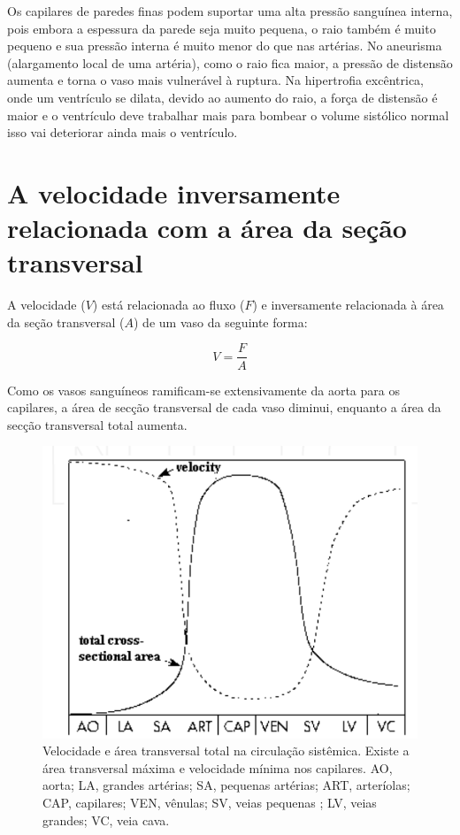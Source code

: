 \documentclass[
  portuguese,
  ]{book}
\begin{document}
Os capilares de paredes finas podem suportar uma alta pressão sanguínea interna, pois embora a espessura da parede seja muito pequena, o raio também é muito pequeno e sua pressão interna é muito menor do que nas artérias. No aneurisma (alargamento local de uma artéria), como o raio fica maior, a pressão de distensão aumenta e torna o vaso mais vulnerável à ruptura. Na hipertrofia excêntrica, onde um ventrículo se dilata, devido ao aumento do raio, a força de distensão é maior e o ventrículo deve trabalhar mais para bombear o volume sistólico normal isso vai deteriorar ainda mais o ventrículo.

\hypertarget{a-velocidade-inversamente-relacionada-com-a-uxe1rea-da-seuxe7uxe3o-transversal}{%
\section{A velocidade inversamente relacionada com a área da seção transversal}\label{a-velocidade-inversamente-relacionada-com-a-uxe1rea-da-seuxe7uxe3o-transversal}}

A velocidade (\(V\)) está relacionada ao fluxo (\(F\)) e inversamente relacionada à área da seção transversal (\(A\)) de um vaso da seguinte forma:

\begin{equation}
V=\frac{F}{A}
\label{eq:velo}
\end{equation}

Como os vasos sanguíneos ramificam-se extensivamente da aorta para os capilares, a área de secção transversal de cada vaso diminui, enquanto a área da secção transversal total aumenta.

\begin{figure}

{\centering \includegraphics{img/hemo_6} 

}

\caption{Velocidade e área transversal total na circulação sistêmica. Existe a área transversal máxima e velocidade mínima nos capilares. AO, aorta; LA, grandes artérias; SA, pequenas artérias; ART, arteríolas; CAP, capilares; VEN, vênulas; SV, veias pequenas ; LV, veias grandes; VC, veia cava.}\label{fig:imghemo6}
\end{figure}
\end{document}
